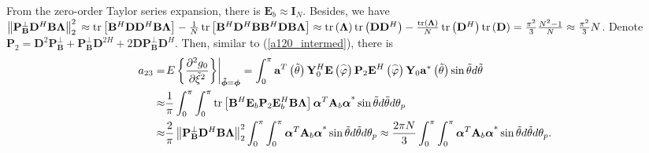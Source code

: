 \documentclass[12pt, draftclsnofoot, onecolumn]{IEEEtran}
\begin{document}
From the zero-order Taylor series expansion, there is ${{\mathbf{E}}_{b}}\approx {{\mathbf{I}}_{N}}$. Besides, we have $\left\| \mathbf{P}_{\mathbf{B}}^{\bot }{{\mathbf{D}}^{H}}\mathbf{B\Lambda} \right\|_{2}^{2} \\
\approx \operatorname{tr}\left[ {{\mathbf{B}}^{H}}\mathbf{D}{{\mathbf{D}}^{H}}\mathbf{B\Lambda} \right] - \frac{1}{N} \operatorname{tr}\left[ {{\mathbf{B}}^{H}}{{\mathbf{D}}^{H}}\mathbf{B}{{\mathbf{B}}^{H}}\mathbf{DB\Lambda} \right]
\approx \operatorname{tr}\left( \mathbf{\Lambda} \right) \operatorname{tr}\left( \mathbf{D}{{\mathbf{D}}^{H}} \right)-\frac{\operatorname{tr}\left( \mathbf{\Lambda} \right)}{N}\operatorname{tr}\left( {{\mathbf{D}}^{H}} \right)\operatorname{tr}\left( \mathbf{D} \right)
 = \frac{{{ \rm{\pi} }^{2}}}{3}\frac{{{N}^{2}}-1}{N} \approx \frac{{{ \rm{\pi} }^{2}}}{3}N$. Denote ${\mathbf{P}}_{2} =  {{\mathbf{D}}^{2}}\mathbf{P}_{\mathbf{B}}^{\bot }+\mathbf{P}_{\mathbf{B}}^{\bot }{{\mathbf{D}}^{2H}}+2\mathbf{DP}_{\mathbf{B}}^{\bot }{{\mathbf{D}}^{H}} $.
Then, similar to (\ref{a120_intermed}), there is
\begin{align}\label{a23}
{{a}_{23}}= & {{\left. E\left\{ \frac{{{\partial }^{2}}{{g}_{0}}}{\partial {{{\tilde{\xi }}}^{2}}} \right\} \right|}_{\boldsymbol{\tilde{\phi}} = \boldsymbol{\phi} }} = \int_{0}^{ \rm{\pi} }{{{\mathbf{a}}^{T}}\left( {\tilde{\theta }} \right)\mathbf{Y}_{0}^{H}\mathbf{E}\left( {\overset{\scriptscriptstyle\frown}{\varphi }} \right){{\mathbf{P}}_{2}}{{\mathbf{E}}^{H}}\left( {\overset{\scriptscriptstyle\frown}{\varphi }} \right){{\mathbf{Y}}_{0}}{{\mathbf{a}}^{*}}\left( {\tilde{\theta }} \right)\sin \tilde{\theta }d\tilde{\theta }} \nonumber \\
\approx & \frac{1}{{ \rm{\pi} }}\int_{0}^{ \rm{\pi} }\int_{0}^{ \rm{\pi} }\operatorname{tr}\left[ {{\mathbf{B}}^{H}}{{\mathbf{E}}_{b}}{{\mathbf{P}}_{2}}\mathbf{E}_{b}^{H}\mathbf{B\Lambda} \right] {{{\boldsymbol{\alpha }}^{T}}{{\mathbf{A}}_{b}}{{\boldsymbol{\alpha }}^{\text{*}}}\sin \tilde{\theta }d\tilde{\theta }}d{{\theta }_{p}} \nonumber \\
\approx & \frac{2}{{ \rm{\pi} }}\left\| \mathbf{P}_{\mathbf{B}}^{\bot }{{\mathbf{D}}^{H}}\mathbf{B\Lambda} \right\|_{2}^{2}\int_{0}^{ \rm{\pi} }{\int_{0}^{ \rm{\pi} }{{{\boldsymbol{\alpha }}^{T}}{{\mathbf{A}}_{b}}{{\boldsymbol{\alpha }}^{\text{*}}}\sin \tilde{\theta }d\tilde{\theta }}d{{\theta }_{p}}} \approx \frac{2{\rm{\pi}}N}{3} \int_{0}^{ \rm{\pi} }{\int_{0}^{ \rm{\pi} }{{{\boldsymbol{\alpha }}^{T}}{{\mathbf{A}}_{b}}{{\boldsymbol{\alpha }}^{\text{*}}}\sin \tilde{\theta }d\tilde{\theta }}d{{\theta }_{p}}}.
\end{align}
\end{document}
